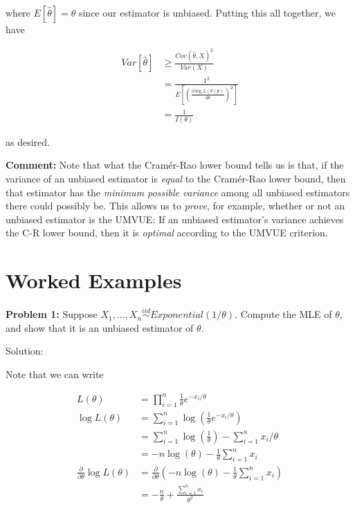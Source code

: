 \documentclass[
  letterpaper,
  DIV=11,
  numbers=noendperiod]{scrreprt}
\begin{document}
where \(E[\hat{\theta}] = \theta\) since our estimator is unbiased.
Putting this all together, we have

\begin{align*}
    Var[\hat{\theta}] & \geq \frac{Cov(\hat{\theta},X)^2}{Var(X)} \\
    & = \frac{1^2}{E \left[ \left( \frac{\partial \log L(\theta \mid \textbf{y})}{\partial \theta} \right)^2\right ]} \\
    & = \frac{1}{I(\theta)}
\end{align*}

as desired.

\textbf{Comment:} Note that what the Cramér-Rao lower bound tells us is
that, if the variance of an unbiased estimator is \emph{equal} to the
Cramér-Rao lower bound, then that estimator has the \emph{minimum
possible variance} among all unbiased estimators there could possibly
be. This allows us to \emph{prove}, for example, whether or not an
unbiased estimator is the UMVUE: If an unbiased estimator's variance
achieves the C-R lower bound, then it is \emph{optimal} according to the
UMVUE criterion.

\section{Worked Examples}\label{worked-examples-3}

\textbf{Problem 1:} Suppose
\(X_1, \dots, X_n \overset{iid}{\sim} Exponential(1/\theta)\). Compute
the MLE of \(\theta\), and show that it is an unbiased estimator of
\(\theta\).

Solution:

Note that we can write

\begin{align*}
    L(\theta) & = \prod_{i = 1}^n \frac{1}{\theta} e^{-x_i / \theta} \\
    \log L(\theta) & = \sum_{i = 1}^n \log(\frac{1}{\theta} e^{-x_i / \theta}) \\
    & = \sum_{i = 1}^n  \log(\frac{1}{\theta}) - \sum_{i = 1}^n x_i / \theta \\
    & = -n \log(\theta) - \frac{1}{\theta} \sum_{i = 1}^n x_i \\
    \frac{\partial}{\partial \theta} \log L(\theta) & = \frac{\partial}{\partial \theta}  \left( -n \log(\theta) - \frac{1}{\theta} \sum_{i = 1}^n x_i \right) \\
    & = -\frac{n}{\theta} + \frac{\sum_{i = 1}^n x_i }{\theta^2} 
\end{align*}
\end{document}
